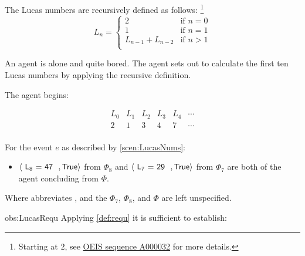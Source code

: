 \begin{note}
  \begin{scenario}
    \label{scen:LucasNums}
    The Lucas numbers are recursively defined as follows:%
    \footnote{
      Starting at \(2\), see \hyperlink{cite.OEIS.:aa}{OEIS sequence A000032} for more details.
    }
    \[
      L_{n} = \left\{
        \begin{array}{ll}
          2 & \text{if } n = 0 \\
          1 & \text{if } n = 1 \\
          L_{n-1} + L_{n-2} & \text{if } n > 1 \\
        \end{array}
      \right.
    \]

    An agent is alone and quite bored.
    The agent sets out to calculate the first ten Lucas numbers by applying the recursive definition.

    The agent begins:

    \[
    \begin{array}{cccccc}
      L_{0} & L_{1} & L_{2} & L_{3} & L_{4} & \cdots \\
      \hline
      2 & 1 & 3 & 4 & 7 & \cdots \\
    \end{array}
    \]
  \end{scenario}

  \begin{observation}%
    \label{obs:LucasRequ}%
    For the event \(e\) as described by \autoref{scen:LucasNums}:
    \begin{itemize}
    \item
      \(\pv{\propI{L\textsubscript{8} = 47}}{\valI{True}}\) from \(\Phi_{8}\) and \(\pv{\propI{L\textsubscript{7} = 29}}{\valI{True}}\) from \(\Phi_{7}\) are both  of the agent concluding  from \(\Phi\).
    \end{itemize}
    Where  abbreviates , and the  \(\Phi_{7}\), \(\Phi_{8}\), and \(\Phi\) are left unspecified.
  \end{observation}

  \begin{motivation}{obs:LucasRequ}
    Applying \autoref{def:requ} it is sufficient to establish:


\end{motivation}
\end{note}
